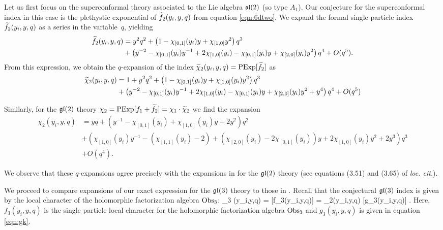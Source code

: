 \parsec
Let us first focus on the superconformal theory associated to the Lie algebra $\mathfrak{sl}(2)$ (so type $A_1$).
Our conjecture for the superconformal index in this case is the plethystic exponential of $\widetilde f_2 (y_i,y,q)$ from equation \eqref{eqn:6dtwo}.
We expand the formal single particle index $\widetilde f_2 (y_i, y, q)$ as a series in the variable~$q$, yielding
\begin{align*}
\widetilde f_2 (y_i,y,q) & = y^2 q^2 + \left(1 - \chi_{[0,1]}(y_i) y + \chi_{[1,0]} y^2 \right) q^3 \\
& + \left(y^{-2} - \chi_{[0,1]}(y_i) y^{-1} + 2 \chi_{[1,0]}(y_i) - \chi_{[0,1]} (y_i) y + \chi_{[2,0]}(y_i) y^2 \right) q^4 + O(q^5) .
\end{align*}
From this expression, we obtain the $q$-expansion of the index $\widetilde \chi_2(y_i,y,q) = \text{PExp}[\widetilde f_2]$ as 
\begin{align*}
\widetilde \chi_2(y_i,y,q) & = 1 + y^2 q^2 + \left(1-\chi_{[0,1]}(y_i) y + \chi_{[1,0]}(y_i)y^2\right)q^3 \\ 
& + \left(y^{-2} - \chi_{[0,1]}(y_i) y^{-1} + 2 \chi_{[1,0]}(y_i) - \chi_{[0,1]} (y_i) y + \chi_{[2,0]}(y_i) y^2 + y^4\right)q^4 + O(q^5)
\end{align*}

Similarly, for the $\mathfrak{gl}(2)$ theory $\chi_2 = \text{PExp}[f_1 + \widetilde f_2] = \chi_1 \cdot \widetilde \chi_2$ we find the expansion
\begin{align*}
\chi_2 (y_i,y,q) & = y q + \left(y^{-1} - \chi_{[0,1]}(y_i) + \chi_{[1,0]}(y_i) y + 2y^2 \right) q^2 \\ 
& + \left( \chi_{[1,0]}(y_i) y^{-1} - (\chi_{[1,1]}(y_i)-2) + (\chi_{[2,0]}(y_i) - 2 \chi_{[0,1]}(y_i)) y + 2 \chi_{[1,0]}(y_i) y^2 + 2y^3\right) q^3 \\ & + O(q^4) .
\end{align*}

We observe that these $q$-expansions agree precisely with the expansions in \cite{Kim:2013nva} for the $\mathfrak{gl}(2)$ theory  
(see equations (3.51) and (3.65) of \textit{loc. cit.}).

\parsec

We proceed to compare expansions of our exact expression for the $\mathfrak{gl}(3)$ theory to those in \cite{Kim:2013nva}. 
Recall that the conjectural $\mathfrak{gl}(3)$ index is given by the local character of the holomorphic factorization algebra $\operatorname{Obs}_3$:
\beqn
\chi_3 (y_i,y,q) = [f_3(y_i,y,q)] = \chi_2(y_i,y,q) \cdot {}[g_3(y_i,y,q)]  .
\eeqn
Here, $f_3(y_i,y,q)$ is the single particle local character for the holomorphic factorization algebra $\operatorname{Obs}_3$ and $g_3(y_i,y,q)$ is given in equation \eqref{eqn:gk}. 

